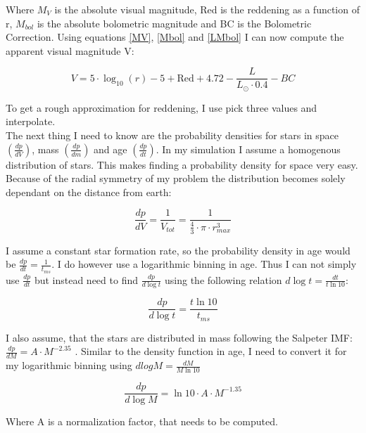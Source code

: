 \documentclass[a4paper,10pt]{article}
\begin{document}
 Where $M_{V}$ is the absolute visual magnitude, Red is the reddening as a function of r, $M_{bol}$ is the absolute bolometric 
 magnitude and BC is the Bolometric Correction. Using equations \ref{MV}, \ref{Mbol} and \ref{LMbol} I can now compute the apparent visual
 magnitude V:
 
 \begin{equation}
  V=5\cdot\log_{10}(r)-5+\mathrm{Red}+4.72-\frac{L}{L_\odot\cdot0.4}-BC
 \end{equation}
 
 To get a rough approximation for reddening, I use \citet*[Figure 9]{2005AJ....130..659A} pick three values and interpolate.\\
 The next thing I need to know are the probability densities for stars in space $\left(\frac{dp}{dV}\right)$, mass 
 $\left(\frac{dp}{dm}\right)$ and age $\left(\frac{dp}{dt}\right)$. In my simulation I assume a homogenous distribution of stars. 
 This makes finding a probability density for space very easy. Because of the radial symmetry of my problem the distribution becomes
 solely dependant on the distance from earth:
 
 \begin{equation}
  \frac{dp}{dV}=\frac{1}{V_{tot}}=\frac{1}{\frac43\cdot\pi\cdot r_{max}^3}
  \label{dpdV}
 \end{equation}
 
 I assume a constant star formation rate, so the probability density in age would be $\frac{dp}{dt}=\frac{1}{t_{ms}}$. I do however 
 use a logarithmic binning in age. Thus I can not simply use $\frac{dp}{dt}$ but instead need to find $\frac{dp}{d\log t}$ using the following 
 relation $d\log t=\frac{dt}{t \ln 10}$: 

 \begin{equation}
  \frac{dp}{d\log t}=\frac{t\ln 10}{t_{ms}}
 \end{equation}
 
 I also assume, that the stars are distributed in mass following the Salpeter IMF:
 $\frac{dp}{dM}=A\cdot M^{-2.35}$ \citep*{1955ApJ...121..161S}. Similar
 to the density function in age, I need to convert it for my logarithmic binning using $dlogM = \frac{dM}{M\ln 10}$
 
 \begin{equation}
  \frac{dp}{d\log M}=\ln 10 \cdot A\cdot M^{-1.35}
 \end{equation}
 
 Where A is a normalization factor, that needs to be computed. 
 
\end{document}
